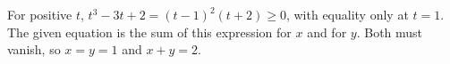 For positive $t$, $t^3-3t+2=(t-1)^2(t+2)\ge0$, with equality only at $t=1$. The given equation is the sum of this expression for $x$ and for $y$. Both must vanish, so $x=y=1$ and $\boxed{x+y=2}$.
